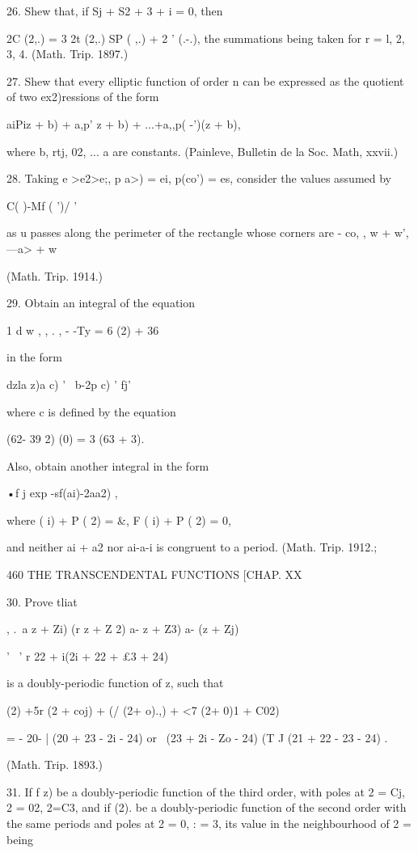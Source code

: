{26. Shew that, if Sj + S2 + 3 + i = 0, then

 2C (2,.) = 3 2t (2,.) SP ( ,.) + 2 ' (.-.), the summations being
taken for r = l, 2, 3, 4. (Math. Trip. 1897.)

27. Shew that every elliptic function of order n can be expressed as
the quotient of two ex2)ressions of the form

aiPiz + b) + a,p' z + b) + ...+a,,p( -')(z + b),

where b, rtj, 02, ... a are constants. (Painleve, Bulletin de la Soc.
Math, xxvii.)

28. Taking e >e2>e;, p a>) = ei, p(co') = es, consider the values
assumed by

C( )-Mf ( ')/ '

as u passes along the perimeter of the rectangle whose corners are -
co, , w + w', —a> + w

(Math. Trip. 1914.)

29. Obtain an integral of the equation

1 d w , , . , - -Ty = 6 (2) + 36



in the form



dzla z)a c) ' \ b-2p c) ' fj'



where c is defined by the equation

(62- 39 2) (0) = 3 (63 + 3).

Also, obtain another integral in the form

 •f j exp -sf(ai)-2aa2) ,

where ( i) + P ( 2) = \&, F ( i) + P ( 2) = 0,

and neither ai + a2 nor ai-a-i is congruent to a period. (Math. Trip.
1912.;



460 THE TRANSCENDENTAL FUNCTIONS [CHAP. XX

30. Prove tliat

, .\ a z + Zi) (r z + Z 2) a- z + Z3) a- (z + Zj)

  '~ ' r 22 + i(2i + 22 + £3 + 24)

is a doubly-periodic function of z, such that

  (2) +5r (2 + coj) + (/ (2+ o).,) + <7 (2+ 0)1 + C02)

= - 20- | (20 + 23 - 2i - 24) or \ (23 + 2i - Zo - 24) (T J (21 + 22 -
23 - 24) .

(Math. Trip. 1893.)

31. If f z) be a doubly-periodic function of the third order, with
poles at 2 = Cj, 2 = 02, 2=C3, and if (2). be a doubly-periodic
function of the second order with the same periods and poles at 2 = 0,
: = 3, its value in the neighbourhood of 2 = being

}
